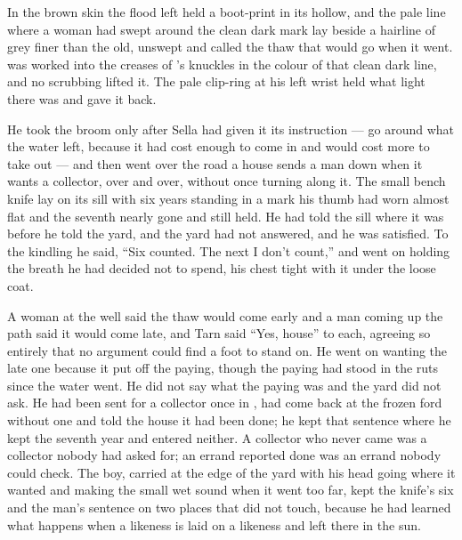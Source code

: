 \scenebreak

In  the brown skin the flood left held a boot-print in its hollow, and the pale line where a woman had swept around the clean dark mark lay beside a hairline of grey finer than the old, unswept and called the thaw that would go when it went.  was worked into the creases of 's knuckles in the colour of that clean dark line, and no scrubbing lifted it. The pale clip-ring at his left wrist held what light there was and gave it back.

He took the broom only after Sella had given it its instruction --- go around what the water left, because it had cost enough to come in and would cost more to take out --- and then went over the road a house sends a man down when it wants a collector, over and over, without once turning along it. The small bench knife lay on its sill with six years standing in a mark his thumb had worn almost flat and the seventh nearly gone and still held. He had told the sill where it was before he told the yard, and the yard had not answered, and he was satisfied. To the kindling he said, “Six counted. The next I don't count,” and went on holding the breath he had decided not to spend, his chest tight with it under the loose coat.

A woman at the well said the thaw would come early and a man coming up the path said it would come late, and Tarn said “Yes, house” to each, agreeing so entirely that no argument could find a foot to stand on. He went on wanting the late one because it put off the paying, though the paying had stood in the ruts since the water went. He did not say what the paying was and the yard did not ask. He had been sent for a collector once in , had come back at the frozen ford without one and told the house it had been done; he kept that sentence where he kept the seventh year and entered neither. A collector who never came was a collector nobody had asked for; an errand reported done was an errand nobody could check. The boy, carried at the edge of the yard with his head going where it wanted and making the small wet sound when it went too far, kept the knife's six and the man's sentence on two places that did not touch, because he had learned what happens when a likeness is laid on a likeness and left there in the sun.

